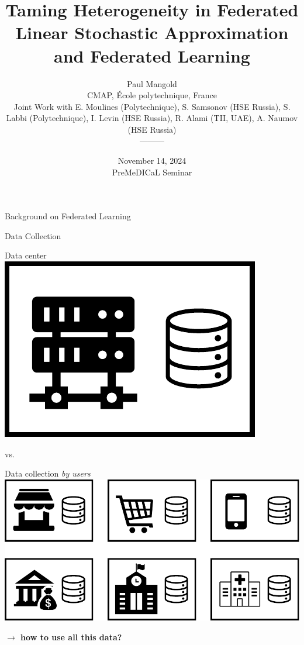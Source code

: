 \documentclass[aspectratio=169,14pt]{beamer}
\title{\LARGE Taming Heterogeneity in Federated Linear Stochastic Approximation and Federated Learning
\vspace{-0.5em}}
\author{
  \vspace{-0.5em}
  Paul Mangold\\[0.5em]
  CMAP, École polytechnique, France\\[0.5em]
  \footnotesize Joint Work with E. Moulines (Polytechnique), S. Samsonov (HSE Russia), S. Labbi (Polytechnique), I. Levin (HSE Russia), R. Alami (TII, UAE), A. Naumov (HSE Russia)
  \\
  ---------\\
  \vspace{-2.5em}
}
\institute{}
\date{November 14, 2024 \\
PreMeDICaL Seminar}
\begin{document}

\begin{frame}[plain]
  \vspace{1.5em}
  \titlepage
\end{frame}
\addtocounter{framenumber}{-1}

\begin{frame}
  \begin{center}
    \textcolor{beamer@blendedblue}{
      \huge Background on Federated Learning
    }
  \end{center}
\end{frame}

\begin{frame}{Data Collection}
  \hspace{-3em}
  \begin{minipage}{0.5\linewidth}
    \begin{center}
      Data center\\[0.5em]
      
      \includegraphics[width=0.4\linewidth]{images/central.pdf}
    \end{center}
    
  \end{minipage}vs.\hspace{1.5em}%
  \begin{minipage}{0.5\linewidth}

    \begin{center}
      Data collection \emph{by users} \\[0.5em]
      
      \includegraphics[width=0.8\linewidth]{images/decentralized.pdf}
    \end{center}
  \end{minipage}

  \vspace{1em}
  
  \begin{center}
    \textbf{
    $\rightarrow$ how to use all this data?}
  \end{center}
\end{frame}
\end{document}
